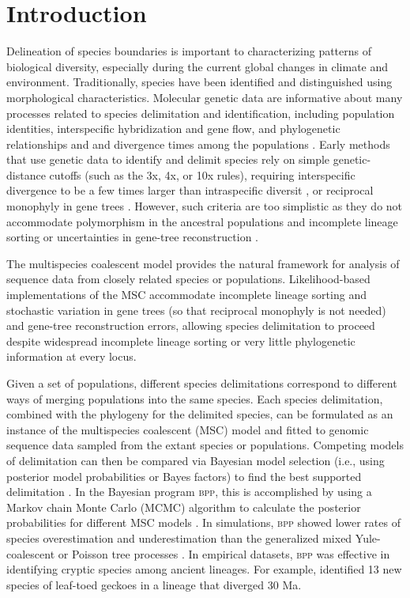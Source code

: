 \documentclass{article1}
\begin{document}
\section{Introduction}

Delineation of species boundaries is important to characterizing patterns of biological
diversity, especially during the current global changes in climate and environment.
Traditionally, species have been identified and distinguished using morphological
characteristics.  Molecular genetic data are informative about many processes related to
species delimitation and identification, including population identities, interspecific
hybridization and gene flow, and phylogenetic relationships and and divergence times among
the populations \citep{Fujita2012, Degnan2018, Kubatko2019, Jiao2021MSC}.  Early methods
that use genetic data to identify and delimit species rely on simple genetic-distance
cutoffs (such as the 3x, 4x, or 10x rules), requiring interspecific divergence to be a few
times larger than intraspecific diversit \citep{Hebert2004}, or reciprocal monophyly in
gene trees  \citep[e.g,][]{Sites2004}.  However, such criteria are too simplistic as they
do not accommodate polymorphism in the ancestral populations and incomplete lineage
sorting \citep{Hudson2003} or uncertainties in gene-tree reconstruction
\citep{Knowles2007, Yang2017}.

The multispecies coalescent model \citep{Rannala2003} provides the natural framework for
analysis of sequence data from closely related species or populations.  Likelihood-based
implementations of the MSC accommodate incomplete lineage sorting and stochastic variation
in gene trees (so that reciprocal monophyly is not needed) and gene-tree reconstruction
errors, allowing species delimitation to proceed despite widespread incomplete lineage
sorting or very little phylogenetic information at every locus.

Given a set of populations, different species delimitations correspond to different ways
of merging populations into the same species.  Each species delimitation, combined with
the phylogeny for the delimited species, can be formulated as an instance of the
multispecies coalescent (MSC) model and fitted to genomic sequence data sampled from the
extant species or populations.  Competing models of delimitation can then be compared via
Bayesian model selection (i.e., using posterior model probabilities or Bayes factors) to
find the best supported delimitation \citep{Yang2010}.  In the Bayesian program
\textsc{bpp}, this is accomplished by using a Markov chain Monte Carlo (MCMC) algorithm to
calculate the posterior probabilities for different MSC models \citep{Yang2010, Yang2014,
Yang2015, Flouri2018}. In simulations, \textsc{bpp} showed lower rates of species
overestimation and underestimation than the generalized mixed Yule-coalescent or Poisson
tree processes \citep{Luo2018}.  In empirical datasets, \textsc{bpp} was effective in
identifying cryptic species among ancient lineages.  For example, \cite{Ramirez-Reyes2020}
identified 13 new species of leaf-toed geckoes in a lineage that diverged 30 Ma.
\end{document}
